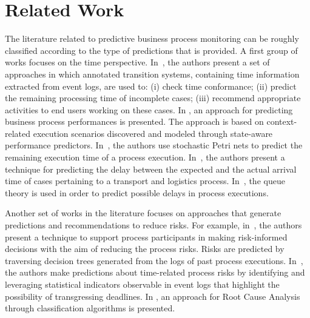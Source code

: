 \section{Related Work} %
\label{sec:related_work}

The literature related to predictive business process monitoring can be roughly classified according to the type of predictions that is provided.
A first group of works focuses on the time perspective. In~\cite{DBLP:journals/is/AalstSS11}, the authors present a set of approaches in which annotated transition systems, containing time information extracted from event logs, are used to: (i) check time conformance;
  (ii) predict the remaining processing time of incomplete cases; (iii) recommend appropriate activities to end users working on these cases. In \cite{Folino}, an approach for predicting business process performances is presented. The approach is based on context-related execution scenarios discovered and modeled through state-aware performance predictors. In~\cite{DBLP:conf/icsoc/Rogge-SoltiW13}, the authors use stochastic Petri nets to predict the remaining execution time of a process execution. In~\cite{Metzgeretal12}, the authors present a technique for predicting the delay between the expected and the actual arrival time of cases pertaining to a transport and logistics process. In~\cite{Senderovichetal15}, the queue theory is used in order to predict possible delays in process executions.

Another set of works in the literature focuses on approaches that generate predictions and recommendations to reduce risks. For example, in~\cite{DBLP:conf/caise/ConfortiLRA13}, the authors present a technique to support process participants in making risk-informed decisions with the aim of reducing the process risks. Risks are predicted by traversing decision trees generated from the logs of past process executions. In~\cite{Pika}, the authors make predictions about time-related process risks by identifying and leveraging statistical indicators observable in event logs  that highlight the possibility of transgressing deadlines.
In \cite{suriadi}, an approach for Root Cause Analysis through classification algorithms is presented.

